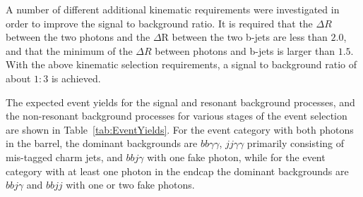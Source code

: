 A number of different additional kinematic requirements were investigated in order to improve the signal to background ratio. It is required that the $\Delta R$ between the two photons and the $\Delta$R between the two b-jets are less than $2.0$, and that the minimum of the  $\Delta R$ between photons and b-jets is larger than $1.5$. With the above kinematic selection requirements, a signal to background ratio of about $1:3$ is achieved.

The expected event yields for the signal and resonant background processes, and the  non-resonant background processes for various stages of the event selection
are shown in Table~\ref{tab:EventYields}. For the event category with both photons in the barrel, the dominant backgrounds are $bb\gamma\gamma$, $jj\gamma\gamma$ primarily consisting of mis-tagged charm jets, and $bbj\gamma$ with one fake photon, while for the event category with at least one photon in the endcap the dominant backgrounds are $bbj\gamma$ and $bbjj$ with one or two fake photons.

